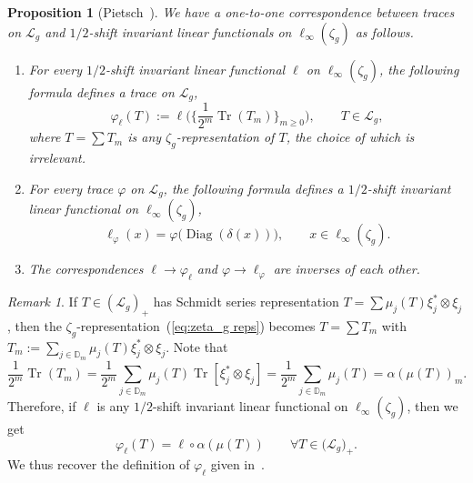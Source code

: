 \documentclass[10pt, a4paper]{amsart}
\newcommand{\D}{\mathbb{D}}
\newcommand{\sL}{\mathscr{L}}
\newcommand{\op}{\operatorname}
\newcommand{\Tr}{\op{Tr}}
\numberwithin{equation}{section}
\newtheorem{proposition}[theorem]{Proposition}
\theoremstyle{definition}
\theoremstyle{remark}
\newtheorem{remark}[theorem]{Remark}
\newcommand{\Diag}{\op{Diag}}
\begin{document}
\begin{proposition}[Pietsch~\cite{Pi:IEOT17}]\label{prop:corpdns on traces}
We have a one-to-one correspondence between traces on $\sL_g$ and  $1/2$-shift invariant linear functionals on $\ell_\infty(\zeta_g)$ as follows.
\begin{enumerate}
 \item For every $1/2$-shift invariant linear functional $\ell$ on $\ell_\infty(\zeta_g)$, the following formula defines a trace on $\sL_g$,
\begin{equation*}
 \varphi_\ell(T):=\ell\bigg( \bigg\{\frac{1}{2^{m}} \Tr(T_m)\bigg\}_{m\geq 0}\bigg), \qquad T\in \sL_g,
\end{equation*}
where $T=\sum T_m$ is any $\zeta_g$-representation of $T$, the choice of which is irrelevant.

\item  For every  trace $\varphi$ on $\sL_g$, the following formula defines a $1/2$-shift invariant linear functional on $\ell_\infty(\zeta_g)$,
\begin{equation}\label{eq:Pietsch.ell-varphi}
 \ell_\varphi(x) = \varphi\big(\Diag(\delta(x))\big), \qquad x \in \ell_\infty(\zeta_g).
\end{equation}

\item The correspondences $\ell \rightarrow \varphi_\ell$ and $\varphi \rightarrow \ell_\varphi$ are inverses of each other.
\end{enumerate}
\end{proposition}

\begin{remark}\label{rmk:zeta_g reps}
 If $T\in (\sL_g)_+$ has Schmidt series representation $T=\sum \mu_j(T) \xi_j^*\otimes \xi_j$, then the $\zeta_g$-representation~(\ref{eq:zeta_g reps}) becomes $T= \sum T_m$ with $T_m:=\sum_{j\in \D_m} \mu_j(T)\xi_j^*\otimes \xi_j$. Note that
\begin{equation*}
 \frac{1}{2^m}\Tr(T_m)=  \frac{1}{2^m}\sum_{j\in \D_m} \mu_j(T) \Tr[ \xi_j^*\otimes \xi_j] = \frac{1}{2^m}\sum_{j\in \D_m} \mu_j(T)=\alpha(\mu(T))_m.
\end{equation*}
Therefore, if $\ell$ is any $1/2$-shift invariant linear functional on $\ell_\infty(\zeta_g)$, then we get
\begin{equation*}
 \varphi_\ell(T) = \ell\circ\alpha(\mu(T)) \qquad \forall T\in \big(\sL_g\big)_+.
\end{equation*}
We thus recover the definition of $\varphi_\ell$ given in~\cite[Chapter~4]{LSZ:Book}.
\end{remark}
\end{document}
